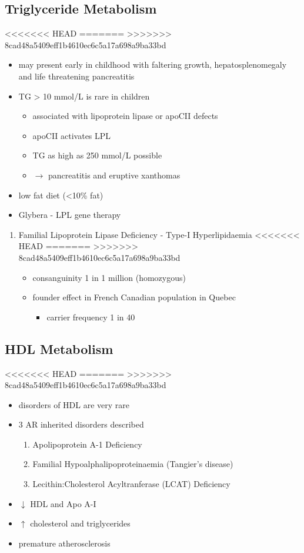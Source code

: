 \documentclass{scrartcl}
\begin{document}
\begin{itemize}
\subsection{Triglyceride Metabolism}
<<<<<<< HEAD
\label{sec:org7a05e4d}
=======
\label{sec:orga039005}
>>>>>>> 8cad48a5409eff1b4610ec6c5a17a698a9ba33bd
\begin{itemize}
\item may present early in childhood with faltering growth,
hepatosplenomegaly and life threatening pancreatitis
\item TG \textgreater{} 10 mmol/L is rare in children
\begin{itemize}
\item associated with lipoprotein lipase or apoCII defects
\item apoCII activates LPL
\item TG as high as 250 mmol/L possible
\item \(\to\) pancreatitis and eruptive xanthomas
\end{itemize}
\item low fat diet (<10\% fat)
\item Glybera - LPL gene therapy
\end{itemize}

\begin{enumerate}
\item Familial Lipoprotein Lipase Deficiency - Type-I Hyperlipidaemia
<<<<<<< HEAD
\label{sec:orgb287dad}
=======
\label{sec:org6dbf112}
>>>>>>> 8cad48a5409eff1b4610ec6c5a17a698a9ba33bd
\begin{itemize}
\item consanguinity 1 in 1 million (homozygous)
\item founder effect in French Canadian population in Quebec
\begin{itemize}
\item carrier frequency 1 in 40
\end{itemize}
\end{itemize}
\end{enumerate}
\subsection{HDL Metabolism}
<<<<<<< HEAD
\label{sec:orgd3231ca}
=======
\label{sec:org3842ce0}
>>>>>>> 8cad48a5409eff1b4610ec6c5a17a698a9ba33bd
\begin{itemize}
\item disorders of HDL are very rare
\item 3 AR inherited disorders described
\begin{enumerate}
\item Apolipoprotein A-1 Deficiency
\item Familial Hypoalphalipoproteinaemia (Tangier’s disease)
\item Lecithin:Cholesterol Acyltranferase (LCAT) Deficiency
\end{enumerate}
\item \(\downarrow\) HDL and Apo A-I
\item \(\uparrow\) cholesterol and triglycerides
\item premature atherosclerosis
\end{itemize}

\end{itemize}
\end{document}
